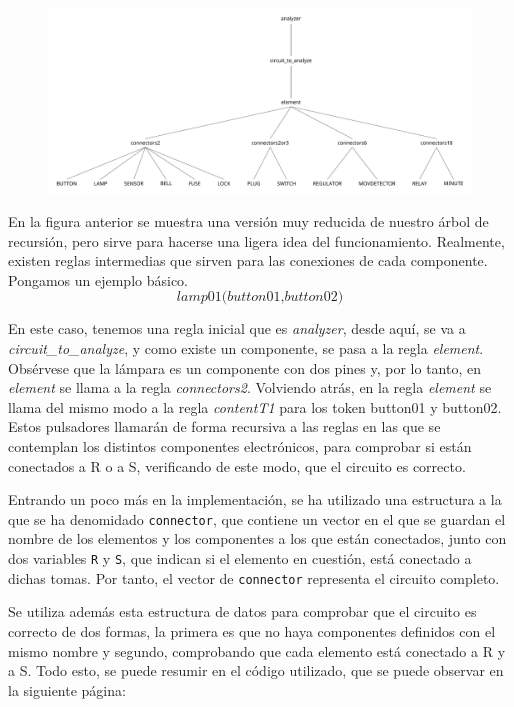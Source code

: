 \documentclass{article}
\begin{document}
\newpage


\begin{figure}[h!]
  \centering
  \includegraphics[scale=0.60]{Tree.pdf}
\end{figure}

En la figura anterior se muestra una versión muy reducida de nuestro árbol de recursión, pero sirve para hacerse una ligera idea del funcionamiento. Realmente, existen reglas intermedias que sirven para las conexiones de cada componente. Pongamos un ejemplo básico. $$\textit{lamp01(button01,button02)}$$

En este caso, tenemos una regla inicial que es \textit{analyzer}, desde aquí, se va a \textit{circuit\_to\_analyze}, y como existe un componente, se pasa a la regla \textit{element}. Obsérvese que la lámpara es un componente con dos pines y, por lo tanto, en \textit{element} se llama a la regla \textit{connectors2}. Volviendo atrás, en la regla \textit{element} se llama del mismo modo a la regla \textit{contentT1} para los token button01 y button02. Estos pulsadores llamarán de forma recursiva a las reglas en las que se contemplan los distintos componentes electrónicos, para comprobar si están conectados a R o a S, verificando de este modo, que el circuito es correcto.

Entrando un poco más en la implementación, se ha utilizado una estructura a la que se ha denomidado \texttt{connector}, que contiene un vector en el que se guardan el nombre de los elementos y los componentes a los que están conectados, junto con dos variables \texttt{R} y \texttt{S}, que indican si el elemento en cuestión, está conectado a dichas tomas. Por tanto, el vector de \texttt{connector} representa el circuito completo.

Se utiliza además esta estructura de datos para comprobar que el circuito es correcto de dos formas, la primera es que no haya componentes definidos con el mismo nombre y segundo, comprobando que cada elemento está conectado a R y a S. Todo esto, se puede resumir en el código utilizado, que se puede observar en la siguiente página:
\end{document}
